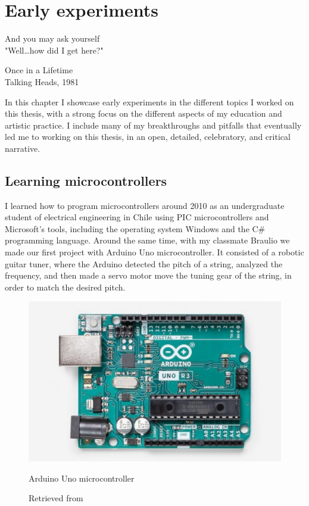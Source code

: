\chapter{Early experiments}

\epigraph{And you may ask yourself \\ "Well\dots how did I get here?"}{Once in a Lifetime \\ Talking Heads, 1981}

In this chapter I showcase early experiments in the different topics I worked on this thesis, with a strong focus on the different aspects of my education and artistic practice.  I include many of my breakthroughs and pitfalls that eventually led me to working on this thesis, in an open, detailed, celebratory, and critical narrative.

\section{Learning microcontrollers}

I learned how to program microcontrollers around 2010 as an undergraduate student of electrical engineering in Chile using PIC microcontrollers and Microsoft's tools, including the operating system Windows and the C\# programming language. Around the same time, with my classmate Braulio we made our first project with Arduino Uno microcontroller. It consisted of a robotic guitar tuner, where the Arduino detected the pitch of a string, analyzed the frequency, and then made a servo motor move the tuning gear of the string, in order to match the desired pitch.

\begin{figure}[ht]
  \centering
  \includegraphics[width=0.75\linewidth,height=0.25\textheight,keepaspectratio]{images/arduino-uno.jpg}
  \caption{Arduino Uno microcontroller}
  \caption*{Retrieved from \cite{website-arduino-uno}}
  \label{fig:arduino-uno}
\end{figure}


